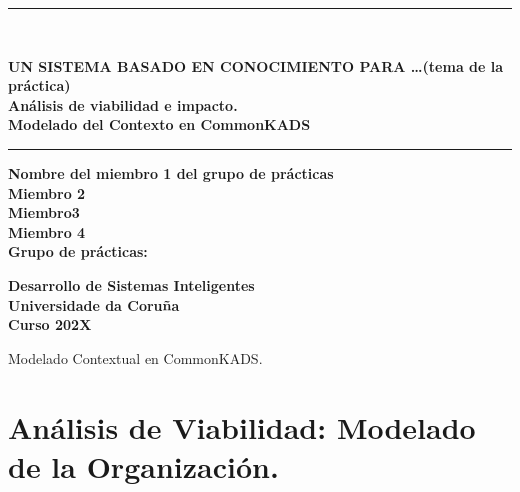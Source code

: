 \documentclass[12pt,a4paper,twoside,spanish]{article}      %
\begin{document}
    \def\chaptername{Capítulo}
    \def\tablename{Tabla}
    \def\listtablename{Índice de Tablas}
    \chapterfont{\LARGE\raggedleft}
    

    \pagestyle{empty}
    
    \begin{titlepage}
        \setlength{\parindent}{0cm} \setlength{\parskip}{0cm}
        \newcommand{\HRule}{\rule{\linewidth}{1mm}}
        
        \vspace*{2cm}
        \HRule \\[0.5cm]
        \begin{center}
        \textsf{\textbf{\large UN SISTEMA BASADO EN CONOCIMIENTO PARA \ldots(tema de la práctica)\\[1.5cm]
        Análisis de viabilidad e impacto. \\[0.25cm] Modelado del Contexto en CommonKADS \\[0.5cm]}}
        \HRule \vspace*{4cm}
        
        \textsf{\textbf{\normalsize Nombre del miembro 1 del grupo de prácticas\\Miembro 2\\Miembro3\\Miembro 4 \\[1cm]
        Grupo de prácticas:\\[3.5cm]}}
        
        \textsf{\textbf{\small Desarrollo de Sistemas Inteligentes\\
        Universidade da Coruña \\ Curso 202X}}
        \end{center}
    \end{titlepage}
    
    \cleardoublepage
    \tableofcontents
    \cleardoublepage
    
    \pagestyle{myheadings}  {Modelado Contextual en CommonKADS.}
    
    \setlength{\parindent}{1,5cm} \setlength{\parskip}{0,7cm}
    
    \cleardoublepage
    
    \section{Análisis de Viabilidad: Modelado de la Organización.}
\end{document}
